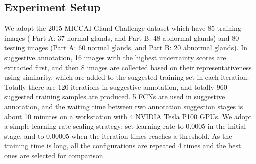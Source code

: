 \documentclass[10pt,twocolumn,letterpaper]{article}
\begin{document}
\subsection{Experiment Setup}
We adopt the 2015 MICCAI Gland Challenge dataset \cite{sirinukunwattana2017gland} which have 85 training images ( Part A: 37 normal glands, and Part B: 48 abnormal glands) and 80 testing images (Part A: 60 normal glands, and Part B: 20 abnormal glands).
In suggestive annotation, 16 images with the highest uncertainty scores are extracted first, and then 8 images are collected based on their representativeness using similarity, which are added to the suggested training set in each iteration.
Totally there are 120 iterations in suggestive annotation, and totally 960 suggested training samples are produced.
5 FCNs are used in suggestive annotation, and the waiting time between two annotation suggestion stages is about 10 minutes on a workstation with 4 NVIDIA Tesla P100 GPUs.
We adopt a simple learning rate scaling strategy: set learning rate to 0.0005 in the initial stage, and to 0.00005 when the iteration times reaches a threshold.
As the training time is long, all the configurations are repeated 4 times and the best ones are selected for comparison.

\end{document}

